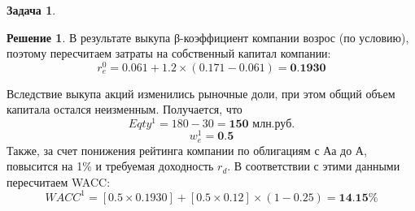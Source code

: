 \documentclass[a4paper, 14pt]{article}
\theoremstyle{plain} %
\theoremstyle{definition} %
\newtheorem*{solution}{Решение}
\newtheorem{problem}{Задача}[subsection]
\theoremstyle{remark} %
\begin{document}
\begin{problem}
\begin{solution}
		В результате выкупа β-коэффициент компании возрос (по условию), поэтому пересчитаем затраты на собственный капитал компании:
		\[r_{e}^{0} = 0.061 + 1.2 \times (0.171 - 0.061) = \textbf{0.1930}\]

		Вследствие выкупа акций изменились рыночные доли, при этом общий объем капитала остался неизменным. Получается, что
		\[Eqty^{1} = 180 - 30 = \textbf{150 млн.руб.}\]
		\[w_{e}^{1} = \textbf{0.5}\]
		Также, за счет понижения рейтинга компании по облигациям с Аа до А, повысится на 1\% и требуемая доходность $r_{d}$. В соответствии с этими данными пересчитаем WACC:
		\[WACC^{1} = \left[0.5 \times 0.1930\right] + \left[0.5 \times 0.12 \right] \times (1-0.25) = \textbf{14.15\%}\]
	\end{solution}
\end{problem}
\end{document}
